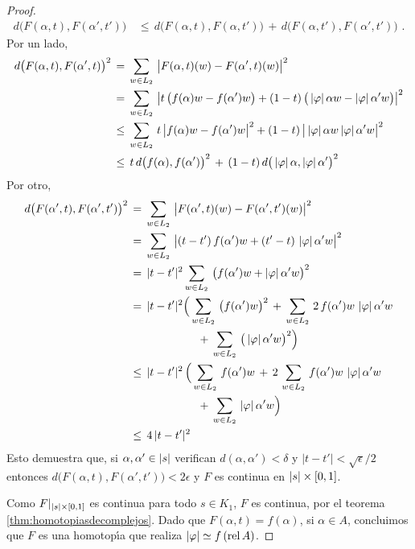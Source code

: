 \begin{proof}
\begin{align*}
		d\big(F(\alpha,t),F(\alpha',t')\big) & \,\leq\,
			d\big(F(\alpha,t),F(\alpha,t')\big) \,+\,
			d\big(F(\alpha,t'),F(\alpha',t')\big)
		\text{ .}
	\end{align*}
	Por un lado,
	\begin{align*}
		d\big(F(\alpha,t),F(\alpha',t)\big)^{2} & \,=\,
			\sum_{w\in L_{2}}\,
				\big|F(\alpha,t)(w)-F(\alpha',t)(w)\big|^{2} \\
		& \,=\,\sum_{w\in L_{2}}\,
			\big|t\,\big(f(\alpha) w-f(\alpha')w\big)+
				(1-t)\,\big(\left|\varphi\right|\alpha w-
				\left|\varphi\right|\alpha' w\big)\big|^{2} \\
		& \,\leq\,\sum_{w\in L_{2}}\,
			t\,\big|f(\alpha)w-f(\alpha')w\big|^{2} +
			(1-t)\,\big|\left|\varphi\right|\alpha w
				\left|\varphi\right|\alpha' w\big|^{2} \\
		& \,\leq\,t\,d\big(f(\alpha),f(\alpha')\big)^{2}\,+\,
			(1-t)\,d\big(\left|\varphi\right|\alpha,
				\left|\varphi\right|\alpha'\big)^{2}
	\end{align*}
	Por otro,
	\begin{align*}
		d\big(F(\alpha',t),F(\alpha',t')\big)^{2} & \,=\,
			\sum_{w\in L_{2}}\,\big|F(\alpha',t)(w)
				-F(\alpha',t')(w)\big|^{2} \\
		& \,=\,\sum_{w\in L_{2}}\,\big|(t-t')\,f(\alpha')w
			+(t'-t)\,\left|\varphi\right|\alpha'w\big|^{2} \\
		& \,=\,|t-t'|^{2}\sum_{w\in L_{2}}\,\big(f(\alpha')w
			+\left|\varphi\right|\alpha'w\big)^{2} \\
		& \,=\,|t-t'|^{2}\Big(
			\sum_{w\in L_{2}}\,\big(f(\alpha')w\big)^{2}
			\,+\,
			\sum_{w\in L_{2}}\,2\,f(\alpha')w\,
				\left|\varphi\right|\alpha'w \\
		&\qquad\qquad\qquad\,+\,
			\sum_{w\in L_{2}}\,\big(\left|\varphi\right|\alpha'w\big)^{2}
			\Big) \\
		& \,\leq\,|t-t'|^{2}\,\Big(
			\sum_{w\in L_{2}}\,f(\alpha')w
			\,+\,
			2\,\sum_{w\in L_{2}}\,f(\alpha')w\,
				\left|\varphi\right|\alpha'w \\
		&\qquad\qquad\qquad\,+\,
			\sum_{w\in L_{2}}\,\left|\varphi\right|\alpha'w
			\Big) \\
		& \,\leq\,4\,|t-t'|^{2}
	\end{align*}
	Esto demuestra que, si $\alpha,\alpha'\in\left|s\right|$ verifican
	$d(\alpha,\alpha')<\delta$ y $|t-t'|<\sqrt{\epsilon}/2$ entonces
	$d\big(F(\alpha,t),F(\alpha',t')\big)<2\epsilon$ y $F$ es
	continua en $\left|s\right|\times\left[0,1\right]$.

	Como $F|_{\left|s\right|\times\left[0,1\right]}$ es continua para todo
	$s\in K_{1}$, $F$ es continua, por el teorema
	\ref{thm:homotopiasdecomplejos}. Dado que $F(\alpha,t)=f(\alpha)$,
	si $\alpha\in A$, concluimos que $F$ es una homotop\'{\i}a
	que realiza $\left|\varphi\right|\simeq f\,(\mathrm{rel}\,A)$.
\end{proof}

